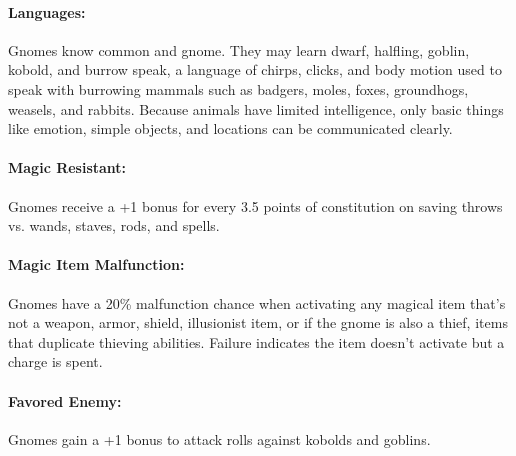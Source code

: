 \begin{multicols}{2}
\paragraph{Languages:} Gnomes know common and gnome.  They may learn dwarf, halfling, goblin, kobold, and burrow speak, a language of chirps, clicks, and body motion used to speak with burrowing mammals such as badgers, moles, foxes, groundhogs, weasels, and rabbits.  Because animals have limited intelligence, only basic things like emotion, simple objects, and locations can be communicated clearly.

\paragraph{Magic Resistant:} Gnomes receive a +1 bonus for every 3.5 points of constitution on saving throws vs. wands, staves, rods, and spells.

\paragraph{Magic Item Malfunction:} Gnomes have a 20\% malfunction chance when activating any magical item that's not a weapon, armor, shield, illusionist item, or if the gnome is also a thief, items that duplicate thieving abilities.  Failure indicates the item doesn't activate but a charge is spent.

\paragraph{Favored Enemy:} Gnomes gain a +1 bonus to attack rolls against kobolds and goblins. 

\columnbreak


\end{multicols}

